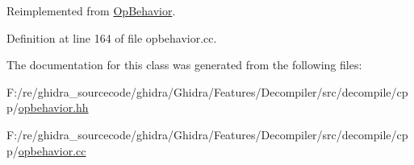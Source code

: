 Reimplemented from \mbox{\hyperlink{class_op_behavior_aeeed3af7aa35264b31a1f182884214a9}{Op\+Behavior}}.



Definition at line 164 of file opbehavior.\+cc.



The documentation for this class was generated from the following files\+:\begin{DoxyCompactItemize}
\item 
F\+:/re/ghidra\+\_\+sourcecode/ghidra/\+Ghidra/\+Features/\+Decompiler/src/decompile/cpp/\mbox{\hyperlink{opbehavior_8hh}{opbehavior.\+hh}}\item 
F\+:/re/ghidra\+\_\+sourcecode/ghidra/\+Ghidra/\+Features/\+Decompiler/src/decompile/cpp/\mbox{\hyperlink{opbehavior_8cc}{opbehavior.\+cc}}\end{DoxyCompactItemize}
